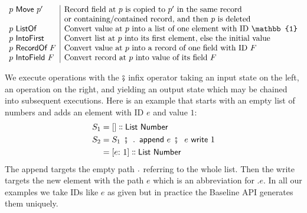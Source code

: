 \documentclass[english,submission]{programming}
\theoremstyle{definition}
\newcommand{\mathbox}[1]{\colorbox{black!10}{$#1$}}
\DeclareMathOperator{\exec}{\ \fatsemi\ \ }
\newcommand{\is}{{:}\ }
\newcommand{\isa}{\dblcolon}
\begin{document}
{\[\begin{array}{l|l}
  p \textsf{ Move } p' & \textrm{Record field at $p$ is copied to $p'$ in the same record}\\
  & \textrm{or containing\slash contained record, and then $p$ is deleted}\\


  p \textsf{ ListOf } & \textrm{Convert value at $p$ into a list of one element with ID $\mathbb{1}$}\\
  p \textsf{ IntoFirst } & \textrm{Convert list at $p$ into its first element, else the initial value} \\

  p \textsf{ RecordOf } F & \textrm{Convert value at $p$ into a record of one field with ID $F$} \\
  p \textsf{ IntoField } F & \textrm{Convert record at $p$ into value of its field $F$} \\

\end{array}\]
}



We execute operations with the \mathbox{\fatsemi} infix operator taking an input state on the left, an operation on the right, and yielding an output state which may be chained into subsequent executions. Here is an example that starts with an empty list of numbers and adds an element with ID $e$ and value $1$:
\begin{align*}
S_1 &= [] \isa \textsf{List Number}\\
S_2 &= S_1 \exec \ldotp \textsf{ append } e \exec e \textsf{ write } 1\\
&= [e \is 1] \isa \textsf{List Number}\\
\end{align*}
The \textsf{append} targets the empty path \mathbox{\ldotp} referring to the whole list. Then the \textsf{write} targets the new element with the path \mathbox{e} which is an abbreviation for \mathbox{.e}. In all our examples we take IDs like $e$ as given but in practice the Baseline API generates them uniquely.
\end{document}
